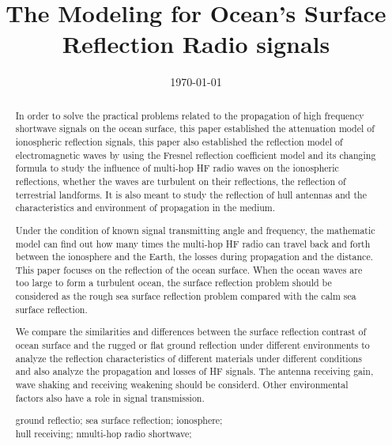 \documentclass{mcmthesis}
\title{\large The Modeling for Ocean's Surface Reflection Radio signals}
\author{ }
\date{\today}
\begin{document}
\begin{abstract}

In order to solve the practical problems related to the propagation of high frequency shortwave signals on the ocean surface, this paper established the attenuation model of ionospheric reflection signals, this paper also established the reflection model of electromagnetic waves by using the Fresnel reflection coefficient model and its changing formula to study the influence of multi-hop HF radio waves on the ionospheric reflections, whether the waves are turbulent on their reflections, the reflection of terrestrial landforms. It is also meant to study the reflection of hull antennas and the characteristics and environment of propagation in the medium.

Under the condition of known signal transmitting angle and frequency, the mathematic model can find out how many times the multi-hop HF radio can travel back and forth between the ionosphere and the Earth, the losses during propagation and the distance. This paper focuses on the reflection of the ocean surface. When the ocean waves are too large to form a turbulent ocean, the surface reflection problem should be considered as the rough sea surface reflection problem compared with the calm sea surface reflection.

We compare the similarities and differences between the surface reflection contrast of ocean surface and the rugged or flat ground reflection under different environments to analyze the reflection characteristics of different materials under different conditions and also analyze the propagation and losses of HF signals. The antenna receiving gain, wave shaking and receiving weakening should be considerd. Other environmental factors also have a role in signal transmission.




\begin{keywords}
ground reflectio; sea surface reflection; ionosphere;
\\ \hspace*{1.2cm}hull receiving; \hspace*{0cm}nmulti-hop radio shortwave;
\end{keywords}
\end{abstract}
\maketitle
\newpage                                                          %
\begin{adjustwidth}{-1.5cm}{0cm}

\setcounter{tocdepth}{3}
\tableofcontents                                                  %

\end{adjustwidth}
\end{document}

